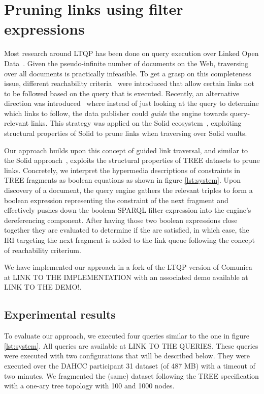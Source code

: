 \section{Pruning links using filter expressions}

Most research around LTQP has been done on query execution over Linked Open Data~\cite{Hartig2016}.
Given the pseudo-infinite number of documents on the Web, traversing over all documents is practically infeasible.
To get a grasp on this completeness issue, different reachability criteria~\cite{hartig2012} were introduced
that allow certain links not to be followed based on the query that is executed.
Recently, an alternative direction was introduced~\cite{verborgh2020}
where instead of just looking at the query to determine which links to follow,
the data publisher could \textit{guide} the engine towards query-relevant links.
This strategy was applied on the Solid ecosystem~\cite{taelman2023},
exploiting structural properties of Solid to prune links when traversing over Solid vaults.

Our approach builds upon this concept of guided link traversal,
and similar to the Solid approach~\cite{taelman2023}, exploits the structural properties of TREE datasets to prune links.
Concretely, we interpret the hypermedia descriptions of constraints in TREE fragments as boolean equations
as shown in figure \ref{lst:system}.
Upon discovery of a document, the query engine gathers the relevant triples to form a boolean expression
representing the constraint of the next fragment and effectively pushes down the boolean SPARQL filter expression into the engine's dereferencing component.
After having those two boolean expressions close together they are evaluated to determine if the are satisfied,
in which case,
the IRI targeting the next fragment is added to the link queue following the concept of reachability criterium.

We have implemented our approach in a fork of the LTQP version of Comunica~\cite{comunica} at
LINK TO THE IMPLEMENTATION with an associated demo available at
LINK TO THE DEMO!.

\subsection{Experimental results}

To evaluate our approach, we executed four queries similar to the one in figure \ref{lst:system}.
All queries are available at LINK TO THE QUERIES.
These queries were executed with two configurations that will be described below.
They were executed over the DAHCC participant 31 dataset (of 487 MB) with a timeout of two minutes.
We fragmented the (same) dataset following the TREE specification with a one-ary tree topology with 100 and 1000 nodes.


